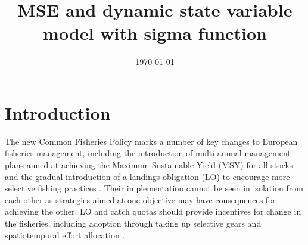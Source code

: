 \documentclass[12pt,oneline,a4paper,numbib]{ouparticle}
\numberwithin{equation}{subsection} %
\begin{document}
\title{MSE and dynamic state variable model with sigma function}

\author{%
\address{European Commission, Joint Research Centre (JRC), Sustainable Resources Directorate, Water and Marine Resources Unit, Via Enrico Fermi 2749, 21027 Ispra, Italy.}
\and
{}
\address{Wageningen Marine Research, PO Box 68, 1970 AB IJmuiden, The Netherlands.}
}


\date{\today}


\maketitle


\section{Introduction}
\label{sec1}

The new Common Fisheries Policy marks a number of key changes to European fisheries management, including the introduction of multi-annual management plans aimed at achieving the Maximum Sustainable Yield (MSY) for all stocks and the gradual introduction of a landings obligation (LO) to encourage more selective fishing practices \cite{CFP2013}. Their implementation cannot be seen in isolation from each other as strategies aimed at one objective may have consequences for achieving the other. LO and catch quotas should provide incentives for change in the fisheries, including adoption through taking up selective gears and spatiotemporal effort allocation \cite{Alzorriz2016, Alzorriz2018}.
\end{document}
